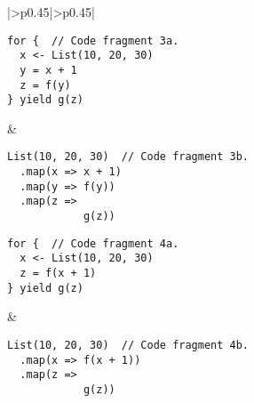 \begin{table}
\begin{centering}
\begin{tabular}{|>{\centering}p{0.45\textwidth}|>{\centering}p{0.45\textwidth}|}
\hspace*{-0.0278\linewidth}%
\begin{minipage}[t]{1.06\linewidth}%
\vspace{-0.86\baselineskip}
\begin{lstlisting}
for {  // Code fragment 3a.
  x <- List(10, 20, 30)
  y = x + 1
  z = f(y)
} yield g(z)
\end{lstlisting}
\vspace{-0.25\baselineskip}
%
\end{minipage} & \hspace*{-0.0278\linewidth}%
\begin{minipage}[t]{1.06\linewidth}%
\vspace{-0.86\baselineskip}
\begin{lstlisting}
List(10, 20, 30)  // Code fragment 3b.
  .map(x => x + 1)
  .map(y => f(y))
  .map(z =>
            g(z))
\end{lstlisting}
\vspace{-0.25\baselineskip}
%
\end{minipage}\tabularnewline
\hline 
\hspace*{-0.0278\linewidth}%
\begin{minipage}[t]{1.06\linewidth}%
\vspace{-0.86\baselineskip}
\begin{lstlisting}
for {  // Code fragment 4a.
  x <- List(10, 20, 30)
  z = f(x + 1)
} yield g(z)
\end{lstlisting}
\vspace{-0.1\baselineskip}
%
\end{minipage} & \hspace*{-0.0278\linewidth}%
\begin{minipage}[t]{1.06\linewidth}%
\vspace{-0.86\baselineskip}
\begin{lstlisting}
List(10, 20, 30)  // Code fragment 4b.
  .map(x => f(x + 1))
  .map(z =>
            g(z))
\end{lstlisting}
\vspace{-0.1\baselineskip}
%
\end{minipage}\tabularnewline
\hline 
\end{tabular}
\par\end{centering}
\caption{Example translations of functor blocks into \lstinline!.map! methods.\label{tab:Example-translations-of-functor-blocks-into-map-methods}}
\end{table}

